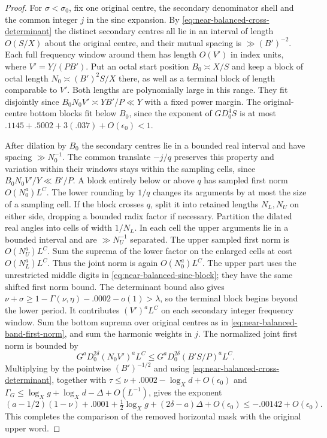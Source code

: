 \documentclass[11pt,a4paper]{article}
\theoremstyle{paperplain}
\numberwithin{equation}{section}
\begin{document}
\begin{proof}
For $\sigma<\sigma_0$, fix one original centre, the
secondary denominator shell and the common integer $j$
in the sinc expansion. By
\eqref{eq:near-balanced-cross-determinant} the distinct
secondary centres all lie in an interval of length $O(S/X)$
about the original centre, and their mutual spacing is
$\gg (B')^{-2}$. Each full frequency window around them
has length $O(V')$ in index units, where $V'=Y/(PB')$.
Put an octal start position $B_0\asymp X/S$ and keep a
block of octal length $N_0\asymp (B')^2 S/X$ there, as
well as a terminal block of length comparable to $V'$.
Both lengths are polynomially large in this range.
They fit disjointly since $B_0N_0V'\asymp YB'/P\ll Y$
with a fixed power margin. The original-centre bottom
blocks fit below $B_0$, since the exponent of $GD_0^4S$
is at most $.1145+.5002+3(.037)+O(\epsilon_0)<1$.

After dilation by $B_0$ the secondary centres lie in a
bounded real interval and have spacing $\gg N_0^{-1}$.
The common translate $-j/q$ preserves this property and
variation within their windows stays within the sampling
cells, since $B_0N_0V'/Y\ll B'/P$. A block entirely below
or above $q$ has sampled first norm $O(N_0^a)L^C$.
The lower rounding by $1/q$ changes its arguments by
at most the size of a sampling cell. If the block crosses
$q$, split it into retained lengths $N_L,N_U$ on either
side, dropping a bounded radix factor if necessary.
Partition the dilated real angles into cells of width
$1/N_L$. In each cell the upper arguments lie in a
bounded interval and are $\gg N_U^{-1}$ separated. The
upper sampled first norm is $O(N_U^a)L^C$. Sum the
suprema of the lower factor on the enlarged cells at
cost $O(N_L^a)L^C$. Thus the joint norm is again
$O(N_0^a)L^C$. The upper part uses the unrestricted
middle digits in \eqref{eq:near-balanced-sinc-block};
they have the same shifted first norm bound. The determinant bound also gives $\nu+\sigma\ge1-\Gamma(\nu,\eta)-.0002-o(1)>\lambda$,
so the terminal block begins beyond the lower period. It contributes
$(V')^a L^C$ on each
secondary integer frequency window. Sum the bottom
suprema over original centres as in
\eqref{eq:near-balanced-band-first-norm}, and sum the
harmonic weights in $j$. The normalized joint first norm
is bounded by
\[
         G^a D_0^{2\delta}(N_0V')^a L^C
             \le G^a D_0^{2\delta}(B'S/P)^a L^C .
\]
Multiplying by the pointwise $(B')^{-1/2}$ and using
\eqref{eq:near-balanced-cross-determinant}, together with
$\tau\le\nu+.0002-\log_X d+O(\epsilon_0)$ and
$\Gamma_G\le\log_X g+\log_X d-\Delta+O(L^{-1})$,
gives the exponent
\[
  (a-1/2)(1-\nu)+.0001+\tfrac12\log_Xg
                       +(2\delta-a)\Delta+O(\epsilon_0)
          \le-.00142+O(\epsilon_0).
\]
This completes the comparison of the removed horizontal
mask with the original upper word.


\end{proof}
\end{document}
